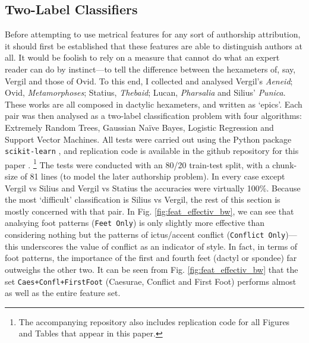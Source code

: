 \documentclass[11pt,a4paper]{scrartcl} %
\begin{document}
{\subsection{Two-Label Classifiers}

Before attempting to use metrical features for any sort of authorship attribution, it should first be established that these features are able to distinguish authors at all. It would be foolish to rely on a measure that cannot do what an expert reader can do by instinct---to tell the difference between the hexameters of, say, Vergil and those of Ovid. To this end, I collected and analysed Vergil's \textit{Aeneid}; Ovid, \textit{Metamorphoses}; Statius, \textit{Thebaid}; Lucan, \textit{Pharsalia} and Silius' \textit{Punica}. These works are all composed in dactylic hexameters, and written as `epics'. Each pair was then analysed as a two-label classification problem with four algorithms: Extremely Random Trees, Gaussian Naïve Bayes, Logistic Regression and Support Vector Machines. All tests were carried out using the Python package \texttt{scikit-learn} \cite{scikit-learn}, and replication code is available in the github repository for this paper \cite{nagy_hexml_2019}.%
\footnote{The accompanying repository \cite{nagy_hexml_2019} also includes replication code for all Figures and Tables that appear in this paper.}
The tests were conducted with an 80/20 train-test split, with a chunk-size of 81 lines (to model the later authorship problem). In every case except Vergil vs Silius and Vergil vs Statius the accuracies were virtually 100\%. Because the most `difficult' classification is Silius vs Vergil, the rest of this section is mostly concerned with that pair. In Fig. \ref{fig:feat_effectiv_bw}, we can see that analsying foot patterns (\texttt{Feet Only}) is only slightly more effective than considering nothing but the patterns of ictus/accent conflict (\texttt{Conflict Only})---this underscores the value of conflict as an indicator of style. In fact, in terms of foot patterns, the importance of the first and fourth feet (dactyl or spondee) far outweighs the other two. It can be seen from Fig. \ref{fig:feat_effectiv_bw} that the set \texttt{Caes+Confl+FirstFoot} (Caesurae, Conflict and First Foot) performs almost as well as the entire feature set.

}
\end{document}
